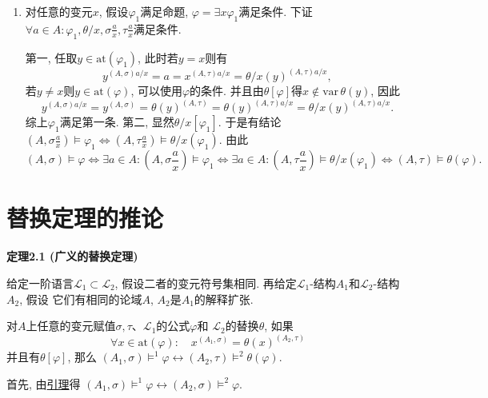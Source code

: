 \documentclass[UTF8]{ctexart}
\begin{document}
\begin{enumerate}
    \item 对任意的变元$x$, 假设$\varphi_1$满足命题,
    $\varphi=\exists x\varphi_1$满足条件. 下证$\forall a\in A:
    \displaystyle\varphi_1,\theta/x,\sigma\frac{a}{x},\tau\frac{a}{x}$满足条件.

    \hspace{2.17em}
    第一, 任取$y\in\mathrm{at}(\varphi_1)$, 此时若$y=x$则有
    \[
        y^{(A,\sigma)a/x}=a=x^{(A,\tau)a/x}=\theta/x(y)^{(A,\tau)a/x},
    \]
    若$y\neq x$则$y\in\mathrm{at}(\varphi)$, 可以使用$\varphi$的条件.
    并且由$\theta[\varphi]$得$x\notin\mathrm{var}\,\theta(y)$, 因此
    \[
        y^{(A,\sigma)a/x}=y^{(A,\sigma)}=\theta(y)^{(A,\tau)}
        =\theta(y)^{(A,\tau)a/x}=\theta/x(y)^{(A,\tau)a/x}.
    \]
    综上$\varphi_1$满足第一条. 第二, 显然$\theta/x[\varphi_1]$.
    于是有结论$\displaystyle\left(A,\sigma\frac{a}{x}\right)\models\varphi_1\iff
    \left(A,\tau\frac{a}{x}\right)\models\theta/x(\varphi_1)$. 由此
    \begin{equation*}
        (A,\sigma)\models\varphi\iff
        \exists a\in A:\left(A,\sigma\frac{a}{x}\right)\models\varphi_1\iff
        \exists a\in A:\left(A,\tau\frac{a}{x}\right)\models\theta/x(\varphi_1)\iff
        (A,\tau)\models\theta(\varphi).
    \tag*{\qedsymbol}\end{equation*}
\end{enumerate}





\newpage

\section{替换定理的推论}

\hypertarget{sec:定理2.1}{}
\noindent\textbf{定理2.1 (广义的替换定理)}

给定一阶语言$\mathcal{L}_1\subset\mathcal{L}_2$, 假设二者的变元符号集相同.
再给定$\mathcal{L}_1$-结构$A_1$和$\mathcal{L}_2$-结构$A_2$, 假设
它们有相同的论域$A$, $A_2$是$A_1$的解释扩张.

对$A$上任意的变元赋值$\sigma,\tau$、$\mathcal{L}_1$的公式$\varphi$和
$\mathcal{L}_2$的替换$\theta$, 如果
\[
    \forall x\in\mathrm{at}(\varphi):\quad x^{(A_1,\sigma)}=\theta(x)^{(A_2,\tau)}
\]
并且有$\theta[\varphi]$, 那么
$(A_1,\sigma)\models^1\varphi\leftrightarrow(A_2,\tau)\models^2\theta(\varphi)$.


首先, 由\href{02 语言的限制与扩张#nameddest=sec:定理1.2}{引理}得
$(A_1,\sigma)\models^1\varphi\leftrightarrow(A_2,\sigma)\models^2\varphi$.
\end{document}
